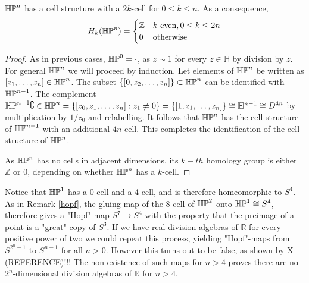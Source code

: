 \begin{definition}

\end{definition}

\begin{prop}
$\mathbb{HP}^{n}$ has a cell structure with a $2k$-cell for $0\leq k\leq n$. As a consequence, $$H_k(\mathbb{HP}^{n})=\begin{cases}\mathbb{Z} & k \text{ even}, 0\leq k\leq 2n \\ 0 & \text{otherwise}\end{cases}$$
\end{prop}

\begin{proof}
As in previous cases, $\mathbb{HP}^{0}=\cdot$, as $z\sim 1$ for every $z\in \mathbb{H}$ by division by $z$. For general $\mathbb{HP}^{n}$ we will proceed by induction. Let elements of $\mathbb{HP}^{n}$ be written as $[z_1,\dots,z_n]\in \mathbb{HP}^{n}$. The subset $\{[0,z_2,\dots,z_n]\}\subset \mathbb{HP}^{n}$ can be identified with $\mathbb{HP}^{n-1}$. The complement $\mathbb{HP}^{n-1}\complement\in \mathbb{HP}^{n}=\{[z_0,z_1,\dots,z_n]:z_1\neq 0\}=\{[1,z_1,\dots,z_n]\}\cong \mathbb{H}^{n-1}\cong D^{4n}$ by multiplication by $1/z_0$ and relabelling. It follows that $\mathbb{HP}^{n}$ has the cell structure of $\mathbb{HP}^{n-1}$ with an additional $4n$-cell. This completes the identification of the cell structure of $\mathbb{HP}^{n}$.

As $\mathbb{HP}^{n}$ has no cells in adjacent dimensions, its $k-th$ homology group is either $\mathbb{Z}$ or $0$, depending on whether $\mathbb{HP}^{n}$ has a $k$-cell.
\end{proof}

\begin{remark}
Notice that $\mathbb{HP}^{1}$ has a 0-cell and a 4-cell, and is therefore homeomorphic to $S^{4}$. As in Remark \ref{hopf}, the gluing map of the 8-cell of $\mathbb{HP}^{2}$ onto $\mathbb{HP}^{1}\cong S^{4}$, therefore gives a "Hopf"-map $S^7\rightarrow S^4$ with the property that the preimage of a point is a "great" copy of $S^3$. If we have real division algebras of $\mathbb{R}$ for every positive power of two we could repeat this process, yielding "Hopf"-maps from $S^{2^n-1}$ to $S^{n-1}$ for all $n>0$. However this turns out to be false, as shown by X (REFERENCE)!!! The non-existence of such maps for $n>4$ proves there are no $2^n$-dimensional division algebras of $\mathbb{R}$ for $n>4$.
\end{remark}